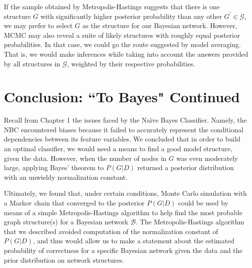 \documentclass[12pt,twoside]{reedthesis}
\begin{document}
			If the sample obtained by Metropolis-Hastings suggests that there is one structure $G$ with significantly higher posterior probability than any other $G^{'} \in \mathcal G$, we may prefer to select $G$ as the structure for our Bayesian network. However, MCMC may also reveal a suite of likely structures with roughly equal posterior probabilities. In that case, we could go the route suggested by model averaging. That is, we would make inferences while taking into account the answers provided by all structures in $\mathcal G$, weighted by their respective probabilities.
		\section{Conclusion: ``To Bayes" Continued}
			Recall from Chapter 1 the issues faced by the Na\"{i}ve Bayes Classifier. Namely, the NBC encountered biases because it failed to accurately represent the conditional dependencies between its feature variables. 
			We concluded that in order to build an optimal classifier, we would need a means to find a good model structure, given the data. 
			However, when the number of nodes in $G$ was even moderately large, applying Bayes' theorem to $P(G | D)$ returned a posterior distribution with an unwieldy normalization constant. 
			
			Ultimately, we found that, under certain conditions, Monte Carlo simulation with a Markov chain that converged to the posterior $P(G | D)$ could be used by means of a simple Metropolis-Hastings algorithm to help find the most probable graph structure(s) for a Bayesian network $\mathcal{B}$. 
			The Metropolis-Hastings algorithm that we described avoided computation of the normalization constant of $P(G | D)$, and thus would allow us to make a statement about the estimated probability of correctness for a specific Bayesian network given the data and the prior distribution on network structures.
			
			
			
									
\end{document}
